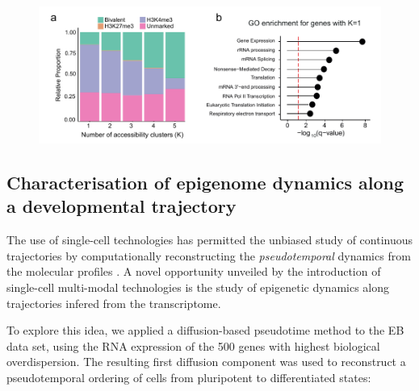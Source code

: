\begin{figure}[H]
	\centering
	\includegraphics[width=0.9\linewidth]{scNMT_profiles_clusters2}
	\caption[]{}
	\label{fig:scnmt_profiles_clusters2}
\end{figure}





\subsection{Characterisation of epigenome dynamics along a developmental trajectory}
The use of single-cell technologies has permitted the unbiased study of continuous trajectories by computationally reconstructing the \textit{pseudotemporal} dynamics from the molecular profiles \cite{Trapnell2014,Haghverdi2016,Saelens2018}. A novel opportunity unveiled by the introduction of single-cell multi-modal technologies is the study of epigenetic dynamics along trajectories infered from the transcriptome.

To explore this idea, we applied a diffusion-based pseudotime method\cite{Haghverdi2016} to the EB data set, using the RNA expression of the 500 genes with highest biological overdispersion\cite{Lun2016}. The resulting first diffusion component was used to reconstruct a pseudotemporal ordering of cells from pluripotent to differentiated states:

